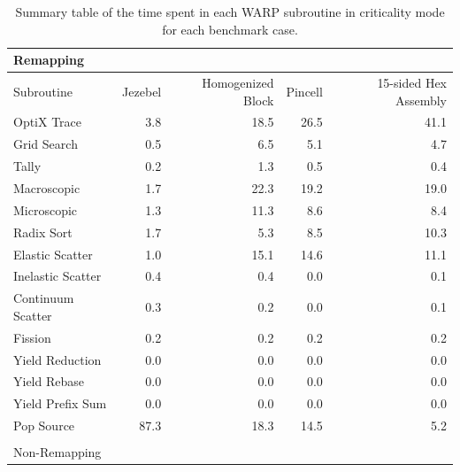 \begin{table}[h]
\centering
\caption{Summary table of the time spent in each WARP subroutine in criticality mode for each benchmark case.}
\label{profile_summary}
\begin{tabular}{| l | r  | r | r | r |}
\multicolumn{5}{l}{Remapping} \\
 \hline
 Subroutine        & Jezebel & Homogenized Block & Pincell & 15-sided Hex Assembly  \\
 \hline \hline
 OptiX Trace       & 3.8       &    18.5                        &   26.5    &      41.1    \\ \hline
 Grid Search       & 0.5       &    6.5                         &   5.1       &      4.7       \\ \hline
 Tally                   & 0.2       &    1.3                         &   0.5       &      0.4       \\ \hline
 Macroscopic      & 1.7       &   22.3                        &   19.2      &     19.0     \\ \hline
 Microscopic       & 1.3       &    11.3                        &  8.6        &      8.4       \\ \hline
 Radix Sort         & 1.7       &     5.3                         &   8.5       &      10.3     \\ \hline
 Elastic Scatter   & 1.0       &     15.1                       &   14.6    &      11.1    \\ \hline
 Inelastic Scatter & 0.4       &     0.4                         &   0.0      &       0.1   \\ \hline
 Continuum Scatter & 0.3   &     0.2                         &   0.0      &       0.1   \\ \hline
 Fission               & 0.2       &      0.2                        &   0.2      &       0.2     \\ \hline
 Yield Reduction  & 0.0       &      0.0                        &   0.0     &       0.0    \\ \hline
 Yield Rebase     & 0.0        &     0.0                         &   0.0     &       0.0   \\ \hline
 Yield Prefix Sum &  0.0       &    0.0                         &   0.0     &       0.0   \\ \hline
 Pop Source         &  87.3     &    18.3                       &   14.5   &      5.2    \\ 
\hline
\multicolumn{5}{l}{} \\
\multicolumn{5}{l}{Non-Remapping} \\

\end{tabular}
\end{table}
